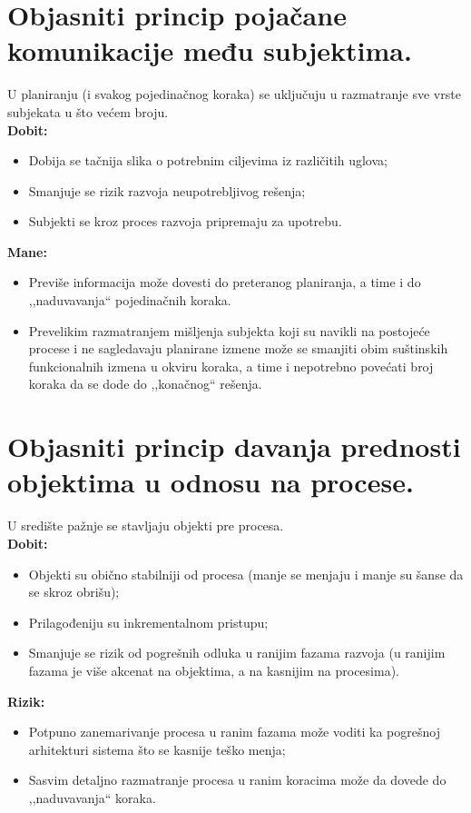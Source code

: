 \documentclass[a4paper]{article}
\begin{document}
\section{Objasniti princip pojačane komunikacije među subjektima.}
  U planiranju (i svakog pojedinačnog koraka) se uključuju u razmatranje 
  sve vrste subjekata u što većem broju.\\
  \textbf{Dobit:}
  \begin{itemize}
    \item Dobija se tačnija slika o potrebnim ciljevima iz različitih uglova;
    \item Smanjuje se rizik razvoja neupotrebljivog rešenja;
    \item Subjekti se kroz proces razvoja pripremaju za upotrebu.
  \end{itemize}
  \textbf{Mane:}
  \begin{itemize}
    \item Previše informacija može dovesti do preteranog planiranja, a time i do ,,naduvavanja`` 
          pojedinačnih koraka.
    \item Prevelikim razmatranjem mišljenja subjekta koji su navikli na postojeće procese i ne sagledavaju 
          planirane izmene može se smanjiti obim suštinskih funkcionalnih izmena u okviru koraka, a time i 
          nepotrebno povećati broj koraka da se dode do ,,konačnog`` rešenja.
  \end{itemize}

\section{Objasniti princip davanja prednosti objektima u odnosu na procese.}
  U središte pažnje se stavljaju objekti pre procesa. \\
  \textbf{Dobit:}
  \begin{itemize}
    \item Objekti su obično stabilniji od procesa (manje se menjaju i manje su šanse da se skroz obrišu);
    \item Prilagođeniju su inkrementalnom pristupu;
    \item Smanjuje se rizik od pogrešnih odluka u ranijim fazama razvoja (u ranijim fazama je više 
          akcenat na objektima, a na kasnijim na procesima). 
  \end{itemize}
  \textbf{Rizik:}
  \begin{itemize}
    \item Potpuno zanemarivanje procesa u ranim fazama može voditi ka pogrešnoj arhitekturi sistema
          što se kasnije teško menja;
    \item Sasvim detaljno razmatranje procesa u ranim koracima može da dovede do ,,naduvavanja`` koraka.
  \end{itemize}
\end{document}
